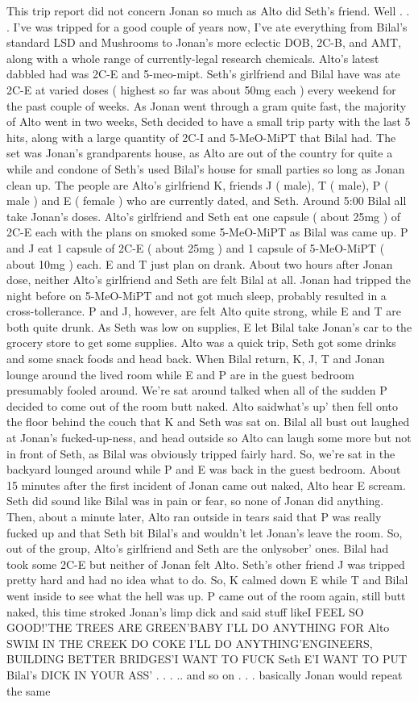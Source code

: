 \documentclass[12pt]{book}
\begin{document}
This trip report did not concern Jonan so much as Alto did Seth's friend. Well . . .  I've was tripped for a good couple of years now, I've ate everything from Bilal's standard LSD and Mushrooms to Jonan's more eclectic DOB, 2C-B, and AMT, along with a whole range of currently-legal research chemicals. Alto's latest dabbled had was 2C-E and 5-meo-mipt. Seth's girlfriend and Bilal have was ate 2C-E at varied doses ( highest so far was about 50mg each ) every weekend for the past couple of weeks. As Jonan went through a gram quite fast, the majority of Alto went in two weeks, Seth decided to have a small trip party with the last 5 hits, along with a large quantity of 2C-I and 5-MeO-MiPT that Bilal had. The set was Jonan's grandparents house, as Alto are out of the country for quite a while and condone of Seth's used Bilal's house for small parties so long as Jonan clean up. The people are Alto's girlfriend K, friends J ( male), T ( male), P ( male ) and E ( female ) who are currently dated, and Seth. Around 5:00 Bilal all take Jonan's doses. Alto's girlfriend and Seth eat one capsule ( about 25mg ) of 2C-E each with the plans on smoked some 5-MeO-MiPT as Bilal was came up. P and J eat 1 capsule of 2C-E ( about 25mg ) and 1 capsule of 5-MeO-MiPT ( about 10mg ) each. E and T just plan on drank. About two hours after Jonan dose, neither Alto's girlfriend and Seth are felt Bilal at all. Jonan had tripped the night before on 5-MeO-MiPT and not got much sleep, probably resulted in a cross-tollerance. P and J, however, are felt Alto quite strong, while E and T are both quite drunk. As Seth was low on supplies, E let Bilal take Jonan's car to the grocery store to get some supplies. Alto was a quick trip, Seth got some drinks and some snack foods and head back. When Bilal return, K, J, T and Jonan lounge around the lived room while E and P are in the guest bedroom presumably fooled around. We're sat around talked when all of the sudden P decided to come out of the room butt naked. Alto saidwhat's up' then fell onto the floor behind the couch that K and Seth was sat on. Bilal all bust out laughed at Jonan's fucked-up-ness, and head outside so Alto can laugh some more but not in front of Seth, as Bilal was obviously tripped fairly hard. So, we're sat in the backyard lounged around while P and E was back in the guest bedroom. About 15 minutes after the first incident of Jonan came out naked, Alto hear E scream. Seth did sound like Bilal was in pain or fear, so none of Jonan did anything. Then, about a minute later, Alto ran outside in tears said that P was really fucked up and that Seth bit Bilal's and wouldn't let Jonan's leave the room. So, out of the group, Alto's girlfriend and Seth are the onlysober' ones. Bilal had took some 2C-E but neither of Jonan felt Alto. Seth's other friend J was tripped pretty hard and had no idea what to do. So, K calmed down E while T and Bilal went inside to see what the hell was up. P came out of the room again, still butt naked, this time stroked Jonan's limp dick and said stuff likeI FEEL SO GOOD!'THE TREES ARE GREEN'BABY I'LL DO ANYTHING FOR Alto SWIM IN THE CREEK DO COKE I'LL DO ANYTHING'ENGINEERS, BUILDING BETTER BRIDGES'I WANT TO FUCK Seth E'I WANT TO PUT Bilal's DICK IN YOUR ASS' . . . .. and so on . . .  basically Jonan would repeat the same 
\end{document}
